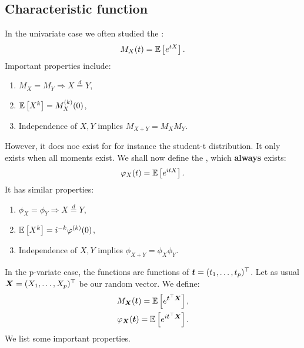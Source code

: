\subsection{Characteristic function}

In the univariate case we often studied the :
$$
    M_X(t) = \mathbb{E}\left[e^{tX}\right].
$$
Important properties include:
\begin{enumerate}
    \item $M_X = M_Y \Rightarrow X \overset{d}{=} Y$,
    \item $\mathbb{E}\left[X^k\right] = M^{(k)}_X(0)$,
    \item Independence of $X, Y$ implies $M_{X+Y} = M_X M_Y$.
\end{enumerate}
However, it does noe exist for for instance the student-t distribution. It only exists when all moments exist. We shall now define the , which \textbf{always} exists:
$$
    \varphi_X(t) = \mathbb{E}\left[e^{itX}\right].
$$
It has similar properties:
\begin{enumerate}
    \item $\phi_X = \phi_Y \Rightarrow X \overset{d}{=} Y$,
    \item $\mathbb{E}\left[X^k\right] = i^{-k} \varphi^{(k)}(0)$,
    \item Independence of $X, Y$ implies $\phi_{X+Y} = \phi_X \phi_Y$.
\end{enumerate}
In the p-variate case, the functions are functions of $\boldsymbol{t}=(t_1,\dots,t_p)^\top$. Let as usual $\boldsymbol{X}=(X_1,\dots,X_p)^\top$ be our random vector. We define:
\begin{align*}
    M_{\boldsymbol{X}}(\boldsymbol{t}) = \mathbb{E}\left[e^{\boldsymbol{t}^\top \boldsymbol{X}}\right], \\
    \varphi_{\boldsymbol{X}}(\boldsymbol{t}) = \mathbb{E}\left[e^{i\boldsymbol{t}^\top \boldsymbol{X}}\right].
\end{align*}
We list some important properties.
